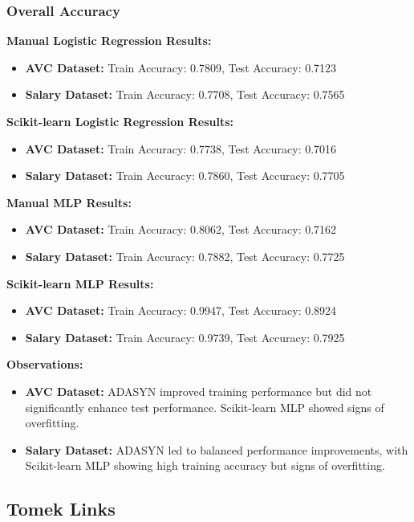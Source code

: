 \documentclass[a4paper,12pt]{article}
\begin{document}
\subsubsection{Overall Accuracy}

\textbf{Manual Logistic Regression Results:}
\begin{itemize}
    \item \textbf{AVC Dataset:} Train Accuracy: 0.7809, Test Accuracy: 0.7123
    \item \textbf{Salary Dataset:} Train Accuracy: 0.7708, Test Accuracy: 0.7565
\end{itemize}

\textbf{Scikit-learn Logistic Regression Results:}
\begin{itemize}
    \item \textbf{AVC Dataset:} Train Accuracy: 0.7738, Test Accuracy: 0.7016
    \item \textbf{Salary Dataset:} Train Accuracy: 0.7860, Test Accuracy: 0.7705
\end{itemize}

\textbf{Manual MLP Results:}
\begin{itemize}
    \item \textbf{AVC Dataset:} Train Accuracy: 0.8062, Test Accuracy: 0.7162
    \item \textbf{Salary Dataset:} Train Accuracy: 0.7882, Test Accuracy: 0.7725
\end{itemize}

\textbf{Scikit-learn MLP Results:}
\begin{itemize}
    \item \textbf{AVC Dataset:} Train Accuracy: 0.9947, Test Accuracy: 0.8924
    \item \textbf{Salary Dataset:} Train Accuracy: 0.9739, Test Accuracy: 0.7925
\end{itemize}

\textbf{Observations:}
\begin{itemize}
    \item \textbf{AVC Dataset:} ADASYN improved training performance but did not significantly enhance test performance. Scikit-learn MLP showed signs of overfitting.
    \item \textbf{Salary Dataset:} ADASYN led to balanced performance improvements, with Scikit-learn MLP showing high training accuracy but signs of overfitting.
\end{itemize}

\subsection{Tomek Links}
\end{document}
